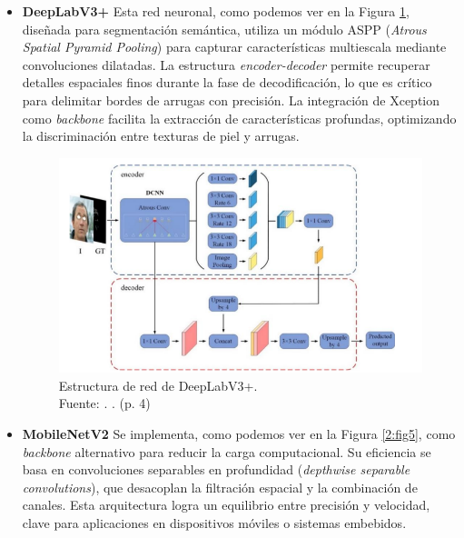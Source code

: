 \begin{itemize}
    \item \textbf{DeepLabV3+}
	Esta red neuronal, como podemos ver en la Figura \ref{2:fig4}, diseñada para segmentación semántica, utiliza un módulo ASPP (\textit{Atrous Spatial Pyramid Pooling}) para capturar características multiescala mediante convoluciones dilatadas. La estructura \textit{encoder-decoder} permite recuperar detalles espaciales finos durante la fase de decodificación, lo que es crítico para delimitar bordes de arrugas con precisión.
	La integración de Xception como \textit{backbone} facilita la extracción de características profundas, optimizando la discriminación entre texturas de piel y arrugas.
	
	\begin{figure}[H]
		\begin{center}
			\includegraphics[width=1\textwidth]{2/figures/Meto1.png}
			\caption[Estructura de red de DeepLabV3+]{Estructura de red de DeepLabV3+.\\
				Fuente: \cite{Zhong2024}. . (p. 4)}
			\label{2:fig4}
		\end{center}
	\end{figure}
	\item \textbf{MobileNetV2}
	Se implementa, como podemos ver en la Figura \ref{2:fig5}, como \textit{backbone} alternativo para reducir la carga computacional. Su eficiencia se basa en convoluciones separables en profundidad (\textit{depthwise separable convolutions}), que desacoplan la filtración espacial y la combinación de canales.
	Esta arquitectura logra un equilibrio entre precisión y velocidad, clave para aplicaciones en dispositivos móviles o sistemas embebidos.
	

\end{itemize}
